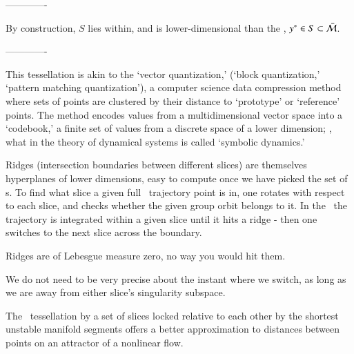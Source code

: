 -------------

By construction, $S$ lies within, and is lower-dimensional than
the \reducedsp, $y^* \in S \subset \bar{\cal M}$.

-------------

%


 This tessellation is akin to the
{`vector quantization,'} (`block quantization,'  `pattern matching quantization'),
a computer science data compression method where sets of points are
clustered by their distance to `prototype' or `reference' points. The
method encodes values from a multidimensional vector space into a
`codebook,' a finite set of values from a discrete space of a lower
dimension; \ie, what in the theory of dynamical systems is called
`symbolic dynamics.'

Ridges (intersection boundaries between different slices) are themselves
hyperplanes of lower dimensions, easy to compute once we have picked
the set of {\template s}. To find what slice a given full \statesp\
trajectory point is in, one rotates with respect to each slice, and
checks whether the given group orbit belongs to it. In the \reducedsp\
the trajectory is integrated within a given slice until it hits a ridge -
then one switches to the next slice across the boundary.

Ridges are of Lebesgue measure zero, no way you would hit them.

We do not need to be very precise about the instant
where we switch, as long as we are away from either slice's singularity
subspace.

The \reducedsp\ tessellation by a set of slices
locked relative to each other by the shortest unstable manifold segments
offers a better approximation to distances between points on an attractor
of a nonlinear flow.

